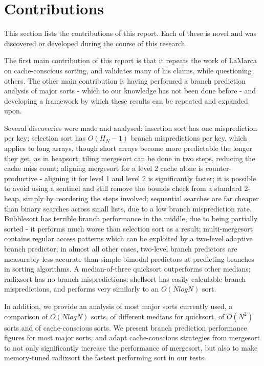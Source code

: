 \section{Contributions}


This section lists the contributions of this report. Each of these is novel  
and was discovered or developed during the course of this research.

The first main contribution of this report is that it repeats the work of LaMarca
on cache-conscious sorting, and validates many of his claims, while questioning
others. The other main contribution is having performed a branch prediction
analysis of major sorts - which to our knowledge has not been done before - and
developing a framework by which these results can be repeated and expanded upon.

Several discoveries were made and analysed: insertion sort has one misprediction
per key; selection sort has $O(H_N-1)$ branch mispredictions per key, which
applies to long arrays, though short arrays become more predictable the longer
they get, as in heapsort; tiling mergesort can be done in two steps, reducing
the cache miss count; aligning mergesort for a level 2 cache alone is
counter-productive - aligning it for level 1 and level 2 is significantly
faster; it is possible to avoid using a sentinel and still remove the bounds
check from a standard 2-heap, simply by reordering the steps involved;
sequential searches are far cheaper than binary searches across small lists, due
to a low branch misprediction rate. Bubblesort has terrible branch performance
in the middle, due to being partially sorted - it performs much worse than
selection sort as a result; multi-mergesort contains regular access patterns
which can be exploited by a two-level adaptive branch predictor; in almost all
other cases, two-level branch predictors are measurably less accurate than
simple bimodal predictors at predicting branches in sorting algorithms. A
median-of-three quicksort outperforms other medians; radixsort has no branch
mispredictions; shellsort has easily calculable branch mispredictions, and
performs very similarly to an $O(NlogN)$ sort. 

In addition, we provide an analysis of most major sorts currently used, a
comparison of $O(NlogN)$ sorts, of different medians for quicksort, of $O(N^2)$
sorts and of cache-conscious sorts. We present branch prediction performance
figures for most major sorts, and adapt cache-conscious strategies from
mergesort to not only significantly increase the performance of mergesort, but
also to make memory-tuned radixsort the fastest performing sort in our tests.

